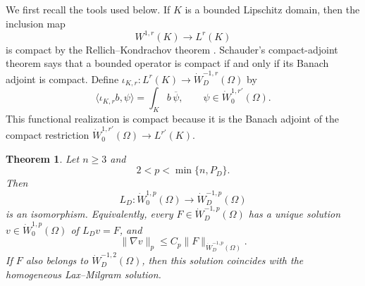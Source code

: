 \documentclass[12pt]{amsart}
\newtheorem{theorem}{Theorem}[section]
\theoremstyle{remark}
\begin{document}
We first recall the tools used below.  If \(K\) is a bounded Lipschitz
domain, then the inclusion map
\[
 W^{1,r}(K)\longrightarrow L^r(K)
\]
is compact by the Rellich--Kondrachov theorem
\cite[Theorem~6.3]{AdamsFournier03}.  Schauder's compact-adjoint theorem
\cite[Theorem~6.4]{Brezis11} says that a bounded operator is compact if
and only if its Banach adjoint is compact.  Define
\(\iota_{K,r}:L^r(K)\to\dot W^{-1,r}_D(\Omega)\) by
\[
 \langle\iota_{K,r}b,\psi\rangle
 =\int_K b\,\overline\psi,
 \qquad \psi\in\dot W^{1,r'}_0(\Omega).
\]
This functional realization is compact because it is the Banach adjoint
of the compact restriction
\(\dot W^{1,r'}_0(\Omega)\to L^{r'}(K)\).


\begin{theorem}
\label{thm:dirichlet-exterior-inverse}
Let \(n\geq3\) and
\[
 2<p<\min\{n,P_D\}.
\]
Then
\[
 L_D:\dot W^{1,p}_0(\Omega)\longrightarrow\dot W^{-1,p}_D(\Omega)
\]
is an isomorphism.  Equivalently, every
\(F\in\dot W^{-1,p}_D(\Omega)\) has a unique solution
\(v\in\dot W^{1,p}_0(\Omega)\) of \(L_Dv=F\), and
\begin{equation}\label{eq:homogeneous-isomorphism}
 \|\nabla v\|_p\leq C_p\|F\|_{\dot W^{-1,p}_D(\Omega)}.
\end{equation}
If \(F\) also belongs to \(\dot W^{-1,2}_D(\Omega)\), then this solution
coincides with the homogeneous Lax--Milgram solution.
\end{theorem}
\end{document}
